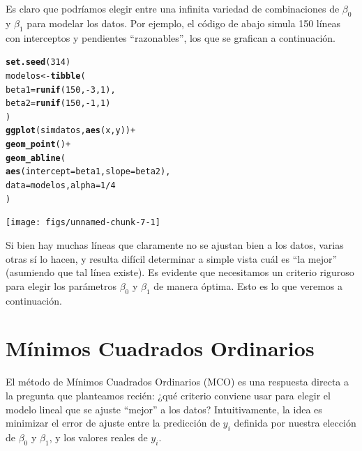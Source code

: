 \documentclass[12pt]{report}\usepackage[]{graphicx}\usepackage[]{color}
\makeatletter
\newcommand{\hlnum}[1]{\textcolor[rgb]{0.686,0.059,0.569}{#1}}%
\newcommand{\hlopt}[1]{\textcolor[rgb]{0,0,0}{#1}}%
\newcommand{\hlstd}[1]{\textcolor[rgb]{0.345,0.345,0.345}{#1}}%
\newcommand{\hlkwb}[1]{\textcolor[rgb]{0.69,0.353,0.396}{#1}}%
\newcommand{\hlkwc}[1]{\textcolor[rgb]{0.333,0.667,0.333}{#1}}%
\newcommand{\hlkwd}[1]{\textcolor[rgb]{0.737,0.353,0.396}{\textbf{#1}}}%
\newenvironment{kframe}{%
 \def\at@end@of@kframe{}%
 \ifinner\ifhmode%
  \def\at@end@of@kframe{\end{minipage}}%
  \begin{minipage}{\columnwidth}%
 \fi\fi%
 \def\FrameCommand##1{\hskip\@totalleftmargin \hskip-\fboxsep
 \colorbox{shadecolor}{##1}\hskip-\fboxsep
     \hskip-\linewidth \hskip-\@totalleftmargin \hskip\columnwidth}%
 \MakeFramed {\advance\hsize-\width
   \@totalleftmargin\z@ \linewidth\hsize
   \@setminipage}}%
 {\par\unskip\endMakeFramed%
 \at@end@of@kframe}
\newenvironment{knitrout}{}{} %
\makeatother
\begin{document}
Es claro que podríamos elegir entre una infinita variedad de combinaciones de $\beta_0$ y $\beta_1$ para modelar los datos. Por ejemplo, el código de abajo simula 150 líneas con interceptos y pendientes ``razonables'', los que se grafican a continuación.

\begin{knitrout}
\color{fgcolor}\begin{kframe}
\begin{alltt}
\hlkwd{set.seed}\hlstd{(}\hlnum{314}\hlstd{)}
\hlstd{modelos} \hlkwb{<-} \hlkwd{tibble}\hlstd{(}
  \hlkwc{beta1} \hlstd{=} \hlkwd{runif}\hlstd{(}\hlnum{150}\hlstd{,} \hlopt{-}\hlnum{3}\hlstd{,} \hlnum{1}\hlstd{),}
  \hlkwc{beta2} \hlstd{=} \hlkwd{runif}\hlstd{(}\hlnum{150}\hlstd{,} \hlopt{-}\hlnum{1}\hlstd{,} \hlnum{1}\hlstd{)}
  \hlstd{)}
\hlkwd{ggplot}\hlstd{(simdatos,} \hlkwd{aes}\hlstd{(x, y))} \hlopt{+}
  \hlkwd{geom_point}\hlstd{()} \hlopt{+}
  \hlkwd{geom_abline}\hlstd{(}
    \hlkwd{aes}\hlstd{(}\hlkwc{intercept} \hlstd{= beta1,} \hlkwc{slope} \hlstd{= beta2),}
    \hlkwc{data} \hlstd{= modelos,} \hlkwc{alpha} \hlstd{=} \hlnum{1}\hlopt{/}\hlnum{4}
  \hlstd{)}
\end{alltt}
\end{kframe}

{\centering \texttt{[image: figs/unnamed-chunk-7-1]} 

}



\end{knitrout}

Si bien hay muchas líneas que claramente no se ajustan bien a los datos, varias otras sí lo hacen, y resulta difícil determinar a simple vista cuál es ``la mejor'' (asumiendo que tal línea existe).
Es evidente que necesitamos un criterio riguroso para elegir los parámetros $\beta_0$ y $\beta_1$ de manera óptima.
Esto es lo que veremos a continuación.


\section{Mínimos Cuadrados Ordinarios}
\label{sec:MCO}

El método de Mínimos Cuadrados Ordinarios (MCO) es una respuesta directa a la pregunta que planteamos recién: ¿qué criterio conviene usar para elegir el modelo lineal que se ajuste ``mejor'' a los datos?
Intuitivamente, la idea es minimizar el error de ajuste entre la predicción de $y_i$ definida por nuestra elección de $\beta_0$ y $\beta_1$, y los valores reales de $y_i$.
\end{document}
